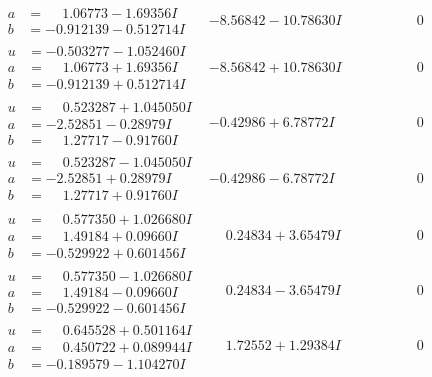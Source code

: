 \documentclass[1p]{elsarticle_modified}
\theoremstyle{definition}
\begin{document}
$$\begin{array}{c|c|c}
\begin{aligned}
a &= \phantom{-}1.06773 - 1.69356 I \\
b &= -0.912139 - 0.512714 I\end{aligned}
 & -8.56842 - 10.78630 I & \phantom{-0.000000 } 0 \\ \hline\begin{aligned}
u &= -0.503277 - 1.052460 I \\
a &= \phantom{-}1.06773 + 1.69356 I \\
b &= -0.912139 + 0.512714 I\end{aligned}
 & -8.56842 + 10.78630 I & \phantom{-0.000000 } 0 \\ \hline\begin{aligned}
u &= \phantom{-}0.523287 + 1.045050 I \\
a &= -2.52851 - 0.28979 I \\
b &= \phantom{-}1.27717 - 0.91760 I\end{aligned}
 & -0.42986 + 6.78772 I & \phantom{-0.000000 } 0 \\ \hline\begin{aligned}
u &= \phantom{-}0.523287 - 1.045050 I \\
a &= -2.52851 + 0.28979 I \\
b &= \phantom{-}1.27717 + 0.91760 I\end{aligned}
 & -0.42986 - 6.78772 I & \phantom{-0.000000 } 0 \\ \hline\begin{aligned}
u &= \phantom{-}0.577350 + 1.026680 I \\
a &= \phantom{-}1.49184 + 0.09660 I \\
b &= -0.529922 + 0.601456 I\end{aligned}
 & \phantom{-}0.24834 + 3.65479 I & \phantom{-0.000000 } 0 \\ \hline\begin{aligned}
u &= \phantom{-}0.577350 - 1.026680 I \\
a &= \phantom{-}1.49184 - 0.09660 I \\
b &= -0.529922 - 0.601456 I\end{aligned}
 & \phantom{-}0.24834 - 3.65479 I & \phantom{-0.000000 } 0 \\ \hline\begin{aligned}
u &= \phantom{-}0.645528 + 0.501164 I \\
a &= \phantom{-}0.450722 + 0.089944 I \\
b &= -0.189579 - 1.104270 I\end{aligned}
 & \phantom{-}1.72552 + 1.29384 I & \phantom{-0.000000 } 0 \\ \hline\begin{aligned}

\end{aligned}
\end{array}$$
\end{document}
